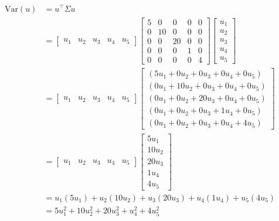 \documentclass{article}
\begin{document}
\begin{align*}
\mathrm{Var}(u) &= u^\top \Sigma u \\
&=
\begin{bmatrix}
  u_1 & u_2 & u_3 & u_4 & u_5 
\end{bmatrix}
\begin{bmatrix}
    5 & 0 & 0 & 0 & 0 \\
    0 & 10 & 0 & 0 & 0 \\
    0 & 0 & 20 & 0 & 0 \\
    0 & 0 & 0 & 1 & 0 \\
    0 & 0 & 0 & 0 & 4 
\end{bmatrix}
\begin{bmatrix}u_1\\u_2\\u_3\\u_4\\u_5\end{bmatrix}\\
&=
\begin{bmatrix}
  u_1 & u_2 & u_3 & u_4 & u_5 
\end{bmatrix}
\begin{bmatrix}
    (5u_1 + 0u_2 + 0u_3 + 0u_4 + 0u_5) \\
    (0u_1 + 10u_2 + 0u_3 + 0u_4 + 0u_5) \\
    (0u_1 + 0u_2 + 20u_3 + 0u_4 + 0u_5) \\
    (0u_1 + 0u_2 + 0u_3 + 1u_4 + 0u_5) \\
    (0u_1 + 0u_2 + 0u_3 + 0u_4 + 4u_5)
\end{bmatrix} \\
&=
\begin{bmatrix}
  u_1 & u_2 & u_3 & u_4 & u_5 
\end{bmatrix}
\begin{bmatrix}
    5u_1 \\
    10u_2 \\
    20u_3 \\
    1u_4 \\
    4u_5
\end{bmatrix}\\
&= u_1(5u_1) + u_2(10u_2) + u_3(20u_3) + u_4(1u_4) + u_5(4u_5) \\
&= 5u_1^2 + 10u_2^2 + 20u_3^2 + u_4^2 + 4u_5^2
\end{align*}
\end{document}
